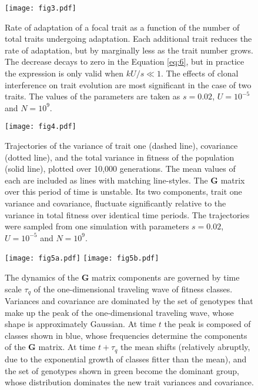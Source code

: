 \documentclass[9pt,twocolumn,twoside]{gsajnl}
\newcommand{\G}{\textbf{G }}
\begin{document}
\begin{figure}[!ht]
\centering
\texttt{[image: fig3.pdf]}
\caption{Rate of adaptation of a focal trait as a function of the number of total traits undergoing adaptation. Each additional trait reduces the rate of adaptation, but by marginally less as the trait number grows. The decrease decays to zero in the Equation \eqref{eq:6}, but in practice the expression is only valid when $kU/s \ll 1$. The effects of clonal interference on trait evolution are most significant in the case of two traits. The values of the parameters are taken as $s=0.02$, $U=10^{-5}$ and $N=10^9$.}
% 
% 
\label{fig:3}
\end{figure}

\begin{figure}[!ht]
\texttt{[image: fig4.pdf]}
% 
% 
\caption{Trajectories of the variance of trait one (dashed line), covariance (dotted line), and the total variance in fitness of the population (solid line), plotted over 10,000 generations. The mean values of each are included as lines with matching line-styles. The \G matrix over this period of time is unstable. Its two components, trait one variance and covariance, fluctuate significantly relative to the variance in total fitness over identical time periods. The trajectories were sampled from one simulation with parameters $s=0.02$, $U=10^{-5}$ and $N=10^9$.}\label{fig:4}
% 
% 
\end{figure}

\begin{figure}[!ht]
\texttt{[image: fig5a.pdf]}
\texttt{[image: fig5b.pdf]}
\caption{The dynamics of the \G matrix components are governed by time scale $\tau_q$ of the one-dimensional traveling wave of fitness classes. Variances and covariance are dominated by the set of genotypes that make up the peak of the one-dimensional traveling wave, whose shape is approximately Gaussian. At time $t$ the peak is composed of classes shown in blue, whose frequencies determine the components of the \G  matrix. At time $t+\tau_q$ the mean shifts (relatively abruptly, due to the exponential growth of classes fitter than the mean), and the set of genotypes shown in green become the dominant group, whose distribution dominates the new trait variances and covariance.}\label{fig:5}
% 
% 
\end{figure}
\end{document}
